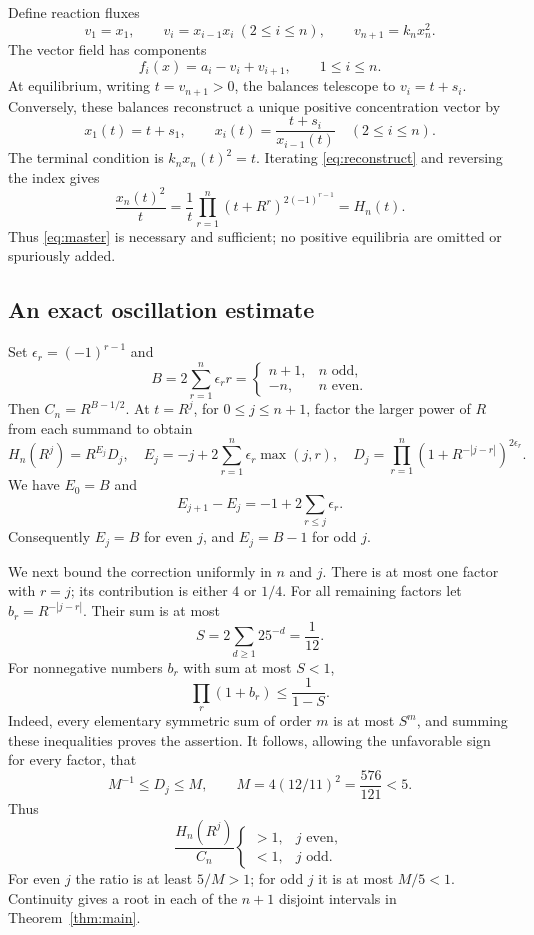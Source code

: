 \documentclass[11pt]{article}
\begin{document}
Define reaction fluxes
\[
v_1=x_1,\qquad v_i=x_{i-1}x_i\ (2\leq i\leq n),\qquad v_{n+1}=k_nx_n^2.
\]
The vector field has components
\begin{equation}\label{eq:balance}
f_i(x)=a_i-v_i+v_{i+1},\qquad1\leq i\leq n.
\end{equation}
At equilibrium, writing $t=v_{n+1}>0$, the balances telescope to $v_i=t+s_i$. Conversely, these balances reconstruct a unique positive concentration vector by
\begin{equation}\label{eq:reconstruct}
x_1(t)=t+s_1,\qquad x_i(t)=\frac{t+s_i}{x_{i-1}(t)}\quad(2\leq i\leq n).
\end{equation}
The terminal condition is $k_nx_n(t)^2=t$. Iterating \eqref{eq:reconstruct} and reversing the index gives
\[
\frac{x_n(t)^2}{t}=\frac1t\prod_{r=1}^n(t+R^r)^{2(-1)^{r-1}}=H_n(t).
\]
Thus \eqref{eq:master} is necessary and sufficient; no positive equilibria are omitted or spuriously added.

\subsection{An exact oscillation estimate}
Set $\epsilon_r=(-1)^{r-1}$ and
\[
B=2\sum_{r=1}^n\epsilon_r r
=\begin{cases}n+1,&n\text{ odd},\\-n,&n\text{ even}.\end{cases}
\]
Then $C_n=R^{B-1/2}$. At $t=R^j$, for $0\leq j\leq n+1$, factor the larger power of $R$ from each summand to obtain
\begin{equation}\label{eq:correction}
H_n(R^j)=R^{E_j}D_j,\quad
E_j=-j+2\sum_{r=1}^n\epsilon_r\max(j,r),\quad
D_j=\prod_{r=1}^n(1+R^{-|j-r|})^{2\epsilon_r}.
\end{equation}
We have $E_0=B$ and
\[
E_{j+1}-E_j=-1+2\sum_{r\leq j}\epsilon_r.
\]
Consequently $E_j=B$ for even $j$, and $E_j=B-1$ for odd $j$.

We next bound the correction uniformly in $n$ and $j$. There is at most one factor with $r=j$; its contribution is either $4$ or $1/4$. For all remaining factors let $b_r=R^{-|j-r|}$. Their sum is at most
\[
S=2\sum_{d\geq1}25^{-d}=\frac1{12}.
\]
For nonnegative numbers $b_r$ with sum at most $S<1$,
\[
\prod_r(1+b_r)\leq\frac1{1-S}.
\]
Indeed, every elementary symmetric sum of order $m$ is at most $S^m$, and summing these inequalities proves the assertion. It follows, allowing the unfavorable sign for every factor, that
\begin{equation}\label{eq:D-bound}
M^{-1}\leq D_j\leq M,\qquad M=4(12/11)^2=\frac{576}{121}<5.
\end{equation}
Thus
\begin{equation}\label{eq:alternation}
\frac{H_n(R^j)}{C_n}
\begin{cases}>1,&j\text{ even},\\<1,&j\text{ odd}.
\end{cases}
\end{equation}
For even $j$ the ratio is at least $5/M>1$; for odd $j$ it is at most $M/5<1$. Continuity gives a root in each of the $n+1$ disjoint intervals in Theorem~\ref{thm:main}.
\end{document}
